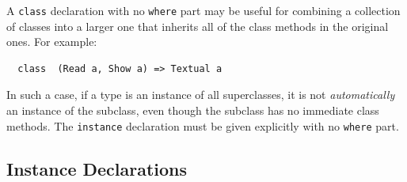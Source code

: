 
A \mbox{\tt class}
declaration with no \mbox{\tt where} part
may be useful for combining a
collection of classes into a larger one that inherits all of the
class methods in the original ones.  For example:
\bprog
{\small\begin{verbatim}
  class  (Read a, Show a) => Textual a
\end{verbatim}}
\eprog
In such a case, if a type is an instance of all
superclasses, it is 
not {\em automatically} an instance of the subclass, even though the
subclass has no immediate class methods.  The \mbox{\tt instance} declaration must be
given explicitly with no \mbox{\tt where} part.

\subsection{Instance Declarations}
\label{instance-decls}

